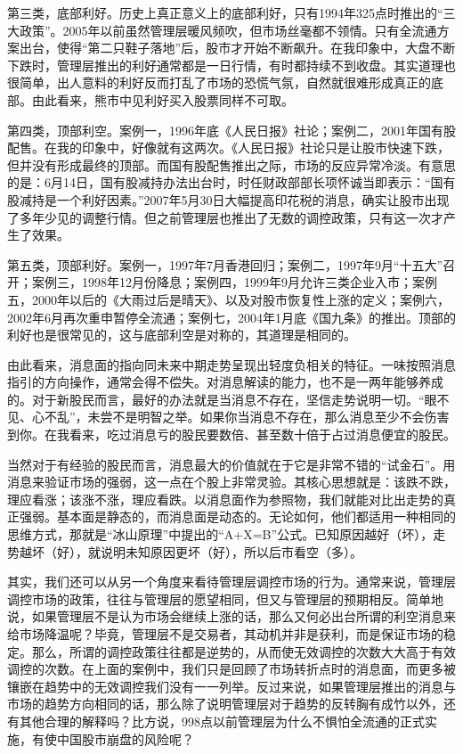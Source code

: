 第三类，底部利好。历史上真正意义上的底部利好，只有1994年325点时推出的“三大政策”。2005年以前虽然管理层暖风频吹，但市场丝毫都不领情。只有全流通方案出台，使得“第二只鞋子落地”后，股市才开始不断飙升。在我印象中，大盘不断下跌时，管理层推出的利好通常都是一日行情，有时都持续不到收盘。其实道理也很简单，出人意料的利好反而打乱了市场的恐慌气氛，自然就很难形成真正的底部。由此看来，熊市中见利好买入股票同样不可取。

第四类，顶部利空。案例一，1996年底《人民日报》社论；案例二，2001年国有股配售。在我的印象中，好像就有这两次。《人民日报》社论只是让股市快速下跌，但并没有形成最终的顶部。而国有股配售推出之际，市场的反应异常冷淡。有意思的是：6月14日，国有股减持办法出台时，时任财政部部长项怀诚当即表示：“国有股减持是一个利好因素。”2007年5月30日大幅提高印花税的消息，确实让股市出现了多年少见的调整行情。但之前管理层也推出了无数的调控政策，只有这一次才产生了效果。

第五类，顶部利好。案例一，1997年7月香港回归；案例二，1997年9月“十五大”召开；案例三，1998年12月份降息；案例四，1999年9月允许三类企业入市；案例五，2000年以后的《大雨过后是晴天》、以及对股市恢复性上涨的定义；案例六，2002年6月再次重申暂停全流通；案例七，2004年1月底《国九条》的推出。顶部的利好也是很常见的，这与底部利空是对称的，其道理是相同的。

由此看来，消息面的指向同未来中期走势呈现出轻度负相关的特征。一味按照消息指引的方向操作，通常会得不偿失。对消息解读的能力，也不是一两年能够养成的。对于新股民而言，最好的办法就是当消息不存在，坚信走势说明一切。“眼不见、心不乱”，未尝不是明智之举。如果你当消息不存在，那么消息至少不会伤害到你。在我看来，吃过消息亏的股民要数倍、甚至数十倍于占过消息便宜的股民。

当然对于有经验的股民而言，消息最大的价值就在于它是非常不错的“试金石”。用消息来验证市场的强弱，这一点在个股上非常灵验。其核心思想就是：该跌不跌，理应看涨；该涨不涨，理应看跌。以消息面作为参照物，我们就能对比出走势的真正强弱。基本面是静态的，而消息面是动态的。无论如何，他们都适用一种相同的思维方式，那就是“冰山原理”中提出的“A+X=B”公式。已知原因越好（坏），走势越坏（好），就说明未知原因更坏（好），所以后市看空（多）。

其实，我们还可以从另一个角度来看待管理层调控市场的行为。通常来说，管理层调控市场的政策，往往与管理层的愿望相同，但又与管理层的预期相反。简单地说，如果管理层不是认为市场会继续上涨的话，那么又何必出台所谓的利空消息来给市场降温呢？毕竟，管理层不是交易者，其动机并非是获利，而是保证市场的稳定。那么，所谓的调控政策往往都是逆势的，从而使无效调控的次数大大高于有效调控的次数。在上面的案例中，我们只是回顾了市场转折点时的消息面，而更多被镶嵌在趋势中的无效调控我们没有一一列举。反过来说，如果管理层推出的消息与市场的趋势方向相同的话，那么除了说明管理层对于趋势的反转胸有成竹以外，还有其他合理的解释吗？比方说，998点以前管理层为什么不惧怕全流通的正式实施，有使中国股市崩盘的风险呢？

